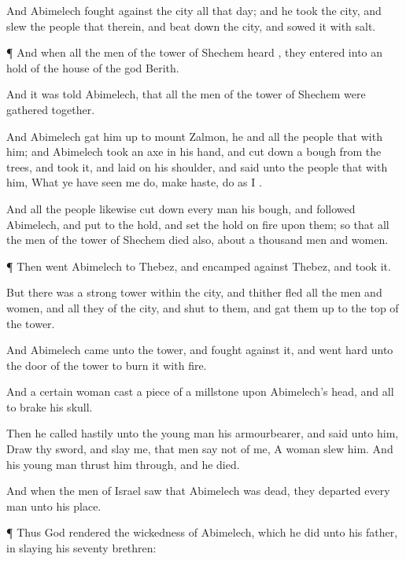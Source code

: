 {And
Abimelech
fought against the
city all that
day; and he
took the
city, and
slew the
people that
{} therein, and beat
down the
city, and
sowed it with
salt.


\par }{\PP {}¶ And when all the
men of the
tower of
Shechem
heard
{}, they
entered into an
hold of the
house of the
god
Berith.

And it was
told
Abimelech, that all the
men of the
tower of
Shechem were gathered
together.

And
Abimelech gat him
up to
mount
Zalmon, he and all the
people that
{} with him; and
Abimelech
took an
axe in his
hand, and cut
down a
bough from the
trees, and
took it, and
laid
{} on his
shoulder, and
said unto the
people that
{} with him, What ye have
seen me
do, make
haste,
{}
do as
I
{}.

And all the
people likewise cut
down every
man his
bough, and
followed
Abimelech, and
put
{} to the
hold, and
set the
hold on
fire upon them; so that all the
men of the
tower of
Shechem
died also, about a
thousand
men and
women.


\par }{\PP {}¶ Then
went
Abimelech to
Thebez, and
encamped against
Thebez, and
took it.

But there was a
strong
tower
within the
city, and thither
fled all the
men and
women, and all
they of the
city, and
shut
{} to them, and gat them
up to the
top of the
tower.

And
Abimelech
came unto the
tower, and
fought against it, and went
hard unto the
door of the
tower to
burn it with
fire.

And a
certain
woman
cast a
piece of a
millstone upon
Abimelech’s
head, and all to
brake his
skull.

Then he
called
hastily unto the young
man his
armourbearer, and
said unto him,
Draw thy
sword, and
slay me, that men
say not of me, A
woman
slew him. And his young
man thrust him
through, and he
died.

And when the
men of
Israel
saw that
Abimelech was
dead, they
departed every
man unto his
place.


\par }{\PP {}¶ Thus
God
rendered the
wickedness of
Abimelech, which he
did unto his
father, in
slaying his
seventy
brethren:

}
